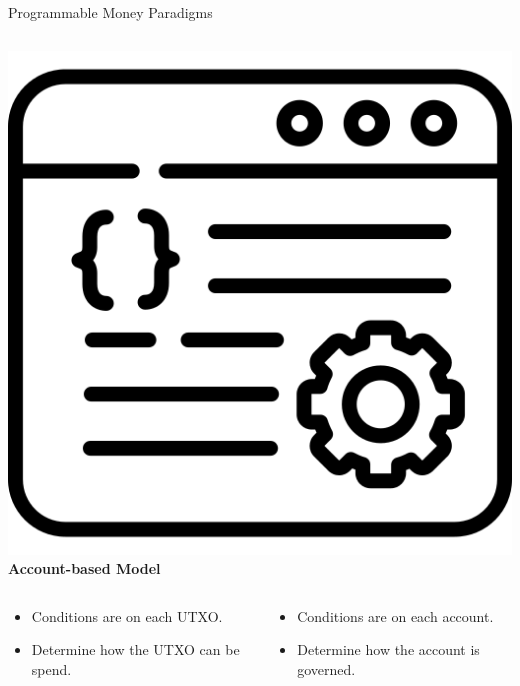 \documentclass[handout]{beamer}
\begin{document}
\begin{frame}{Programmable Money Paradigms}
\begin{columns}[T]
\begin{column}{0.45\textwidth}
			\includegraphics[scale=0.1]{../assets/images/CA.png}
			\textbf{Account-based Model}
		\end{column}
	\end{columns}
	\vspace{1em}
	\begin{columns}[T]
		\begin{column}{0.45\textwidth}
		\vspace{1em}
			\begin{itemize}
				\item Conditions are on each UTXO.
				\item Determine how the UTXO can be spend.
			\end{itemize}
		\end{column}
		\begin{column}{0.45\textwidth}
		\vspace{1em}
			\begin{itemize}
				\item Conditions are on each account.
				\item Determine how the account is governed.
			\end{itemize}
		\end{column}
	\end{columns}
\vspace{1em}
\end{frame}
\end{document}
